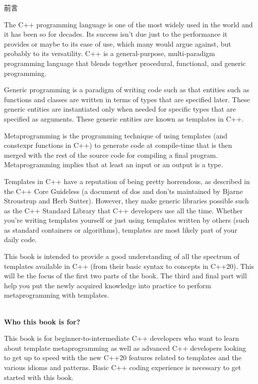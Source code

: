 \begin{flushright}
   前言
\end{flushright}

The C++ programming language is one of the most widely used in the world and it has been so for decades. Its success isn’t due just to the performance it provides or maybe to its ease of use, which many would argue against, but probably to its versatility. C++ is a general-purpose, multi-paradigm programming language that blends together procedural, functional, and generic programming.

Generic programming is a paradigm of writing code such as that entities such as functions and classes are written in terms of types that are specified later. These generic entities are instantiated only when needed for specific types that are specified as arguments. These generic entities are known as templates in C++.

Metaprogramming is the programming technique of using templates (and constexpr functions in C++) to generate code at compile-time that is then merged with the rest of the source code for compiling a final program. Metaprogramming implies that at least an input or an output is a type.

Templates in C++ have a reputation of being pretty horrendous, as described in the C++ Core Guideless (a document of dos and don’ts maintained by Bjarne Stroustrup and Herb Sutter). However, they make generic libraries possible such as the C++ Standard Library that C++ developers use all the time. Whether you’re writing templates yourself or just using templates written by others (such as standard containers or algorithms), templates are most likely part of your daily code.

This book is intended to provide a good understanding of all the spectrum of templates available in C++ (from their basic syntax to concepts in C++20). This will be the focus of the first two parts of the book. The third and final part will help you put the newly acquired knowledge into practice to perform metaprogramming with templates.

\hspace*{\fill} \\ %
\noindent
\textbf{Who this book is for?}

This book is for beginner-to-intermediate C++ developers who want to learn about template metaprogramming as well as advanced C++ developers looking to get up to speed with the new C++20 features related to templates and the various idioms and patterns. Basic C++ coding experience is necessary to get started with this book.

